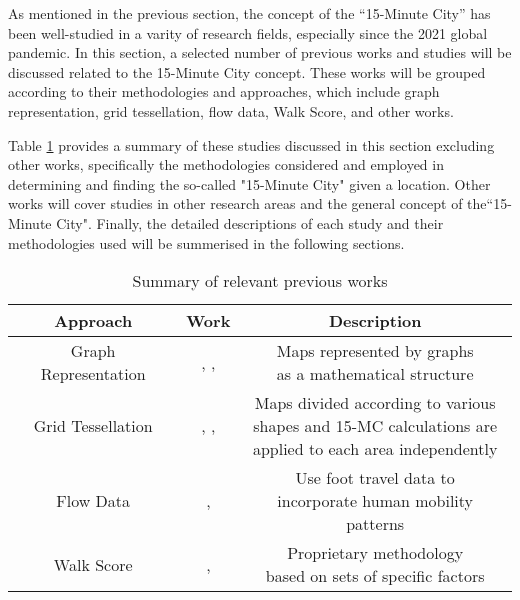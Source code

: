 As mentioned in the previous section, the concept of the ``15-Minute City'' has been well-studied in a varity of research fields, especially since the 2021 global pandemic. In this section, a selected number of previous works and studies will be discussed related to the 15-Minute City concept. These works will be grouped according to their methodologies and approaches, which include graph representation, grid tessellation, flow data, Walk Score, and other works.

Table \ref{tab:previous_works} provides a summary of these studies discussed in this section excluding other works, specifically the methodologies considered and employed in determining and finding the so-called "15-Minute City" given a location. Other works will cover studies in other research areas and the general concept of the``15-Minute City". Finally, the detailed descriptions of each study and their methodologies used will be summerised in the following sections.

\begin{table}[htbp]
    \begin{center}
        \caption{Summary of relevant previous works}
        \label{tab:previous_works}
        \begin{tabular}{ |c|c|c| }
            \hline
            \textbf{Approach} & \textbf{Work} & \textbf{Description} \\
            \hline
            \hline
            Graph Representation & \makecell{\cite{barbieri_graph_2023}, \cite{caselli_exploring_2022},\\\cite{rhoads_inclusive_2023}} & \makecell{Maps represented by graphs\\as a mathematical structure}\\
            \hline
            Grid Tessellation & \makecell{\cite{gaglione_urban_2022}, \cite{olivari_are_2023},\\\cite{Pezzica_Altafini_Mara_Chioni_2024}} & \makecell{Maps divided according to various\\shapes and 15-MC calculations are\\applied to each area independently} \\
            \hline
            Flow Data & \cite{zhang_towards_2023}, \cite{sarkar_measuring_2020} & \makecell{Use foot travel data to\\incorporate human mobility patterns} \\
            \hline
            Walk Score & \cite{walkscore}, \cite{weng_15-minute_2019} & \makecell{Proprietary methodology\\based on sets of specific factors} \\
            \hline
        \end{tabular}
    \end{center}
\end{table}

